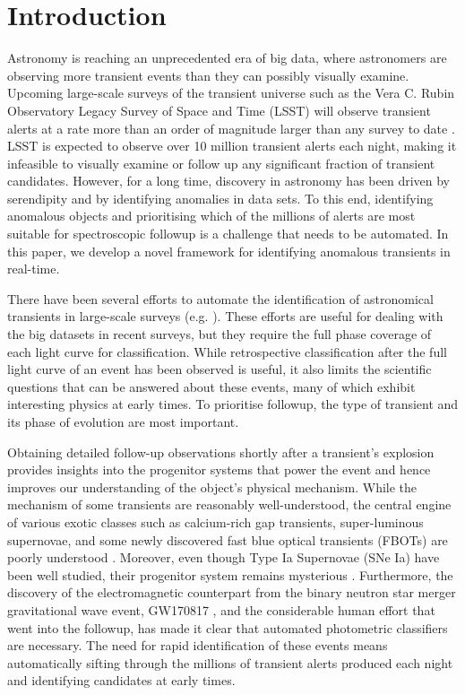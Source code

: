 \documentclass[fleqn,usenatbib]{mnras}
\begin{document}

\section{Introduction}
\label{sec:Introduction}
Astronomy is reaching an unprecedented era of big data, where astronomers are observing more transient events than they can possibly visually examine. Upcoming large-scale surveys of the transient universe such as the Vera C. Rubin Observatory Legacy Survey of Space and Time (LSST) will observe transient alerts at a rate more than an order of magnitude larger than any survey to date \citep{Ivezic2009LSST:Products}. LSST is expected to observe over 10 million transient alerts each night, making it infeasible to visually examine or follow up any significant fraction of transient candidates. However, for a long time, discovery in astronomy has been driven by serendipity and by identifying anomalies in data sets. To this end, identifying anomalous objects and prioritising which of the millions of alerts are most suitable for spectroscopic followup is a challenge that needs to be automated. In this paper, we develop a novel framework for identifying anomalous transients in real-time.

There have been several efforts to automate the identification of astronomical transients in large-scale surveys (e.g. \citealt{Lochner2016,Narayan2018MachineStream,PELICANPasquet2019, Webb2020}). These efforts are useful for dealing with the big datasets in recent surveys, but they require the full phase coverage of each light curve for classification. While retrospective classification after the full light curve of an event has been observed is useful, it also limits the scientific questions that can be answered about these events, many of which exhibit interesting physics at early times. To prioritise followup, the type of transient and its phase of evolution are most important. 

Obtaining detailed follow-up observations shortly after a transient's explosion provides insights into the progenitor systems that power the event and hence improves our understanding of the object's physical mechanism. While the mechanism of some transients are reasonably well-understood, the central engine of various exotic classes such as calcium-rich gap transients, super-luminous supernovae, and some newly discovered fast blue optical transients (FBOTs) are poorly understood \citep[e.g.][]{CoppejansMargutti2020FBOTs}. Moreover, even though Type Ia Supernovae (SNe Ia) have been well studied, their progenitor system remains mysterious \citep[e.g.][for reviews of the current state of SNIa progenitor origin]{Livio2018,Ruiter2020SNIaProgenitors}. Furthermore, the discovery of the electromagnetic counterpart from the binary neutron star merger gravitational wave event, GW170817 \citep{Abbott2017GW170817:Inspiral}, and the considerable human effort that went into the followup, has made it clear that automated photometric classifiers are necessary. The need for rapid identification of these events means automatically sifting through the millions of transient alerts produced each night and identifying candidates at early times.
\end{document}
